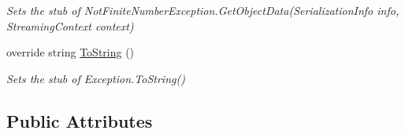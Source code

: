 \begin{DoxyCompactItemize}
\begin{DoxyCompactList}\small\item\em Sets the stub of Not\-Finite\-Number\-Exception.\-Get\-Object\-Data(\-Serialization\-Info info, Streaming\-Context context)\end{DoxyCompactList}\item 
override string \hyperlink{class_system_1_1_fakes_1_1_stub_not_finite_number_exception_af7798ecfd415fdd508e0f2d94103bf3f}{To\-String} ()
\begin{DoxyCompactList}\small\item\em Sets the stub of Exception.\-To\-String()\end{DoxyCompactList}\end{DoxyCompactItemize}
\subsection*{Public Attributes}
